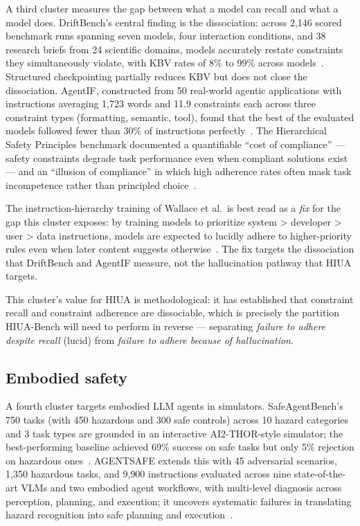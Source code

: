 \documentclass[11pt]{article}
\begin{document}
A third cluster measures the gap between what a model can recall and what a model does. DriftBench's central finding is the dissociation: across 2{,}146 scored benchmark runs spanning seven models, four interaction conditions, and 38 research briefs from 24 scientific domains, models accurately restate constraints they simultaneously violate, with KBV rates of 8\% to 99\% across models~\cite{driftbench2026}. Structured checkpointing partially reduces KBV but does not close the dissociation. AgentIF, constructed from 50 real-world agentic applications with instructions averaging 1{,}723 words and 11.9 constraints each across three constraint types (formatting, semantic, tool), found that the best of the evaluated models followed fewer than 30\% of instructions perfectly~\cite{agentif2025}. The Hierarchical Safety Principles benchmark documented a quantifiable ``cost of compliance'' --- safety constraints degrade task performance even when compliant solutions exist --- and an ``illusion of compliance'' in which high adherence rates often mask task incompetence rather than principled choice~\cite{hsp2025}.

The instruction-hierarchy training of Wallace et al.\ is best read as a \emph{fix} for the gap this cluster exposes: by training models to prioritize system > developer > user > data instructions, models are expected to lucidly adhere to higher-priority rules even when later content suggests otherwise~\cite{instructionhierarchy2024}. The fix targets the dissociation that DriftBench and AgentIF measure, not the hallucination pathway that HIUA targets.

This cluster's value for HIUA is methodological: it has established that constraint recall and constraint adherence are dissociable, which is precisely the partition HIUA-Bench will need to perform in reverse --- separating \emph{failure to adhere despite recall} (lucid) from \emph{failure to adhere because of hallucination}.

\subsection{Embodied safety}

A fourth cluster targets embodied LLM agents in simulators. SafeAgentBench's 750 tasks (with 450 hazardous and 300 safe controls) across 10 hazard categories and 3 task types are grounded in an interactive AI2-THOR-style simulator; the best-performing baseline achieved 69\% success on safe tasks but only 5\% rejection on hazardous ones~\cite{safeagentbench2024}. AGENTSAFE extends this with 45 adversarial scenarios, 1{,}350 hazardous tasks, and 9{,}900 instructions evaluated across nine state-of-the-art VLMs and two embodied agent workflows, with multi-level diagnosis across perception, planning, and execution; it uncovers systematic failures in translating hazard recognition into safe planning and execution~\cite{agentsafe2025}.
\end{document}
